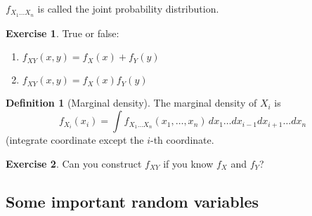 \documentclass[
  openany]{book}
\theoremstyle{definition}
\newtheorem{definition}{Definition}[chapter]
\theoremstyle{definition}
\theoremstyle{definition}
\newtheorem{exercise}{Exercise}[chapter]
\theoremstyle{definition}
\theoremstyle{remark}
\begin{document}
\(f_{X_1\dots X_n}\) is called the joint probability distribution.

\begin{exercise}

True or false:

\begin{enumerate}
\def\labelenumi{\arabic{enumi}.}
\item
  \(f_{XY}(x,y) = f_{X}(x) + f_{Y}(y)\)
\item
  \(f_{XY}(x,y) = f_{X}(x)  f_{Y}(y)\)
\end{enumerate}

\end{exercise}

\begin{definition}[Marginal density]
The marginal density of \(X_i\) is
\[f_{X_i}(x_i) = \int f_{X_1\dots X_n}(x_1, \dots, x_n) \, dx_1\dots dx_{i-1} dx_{i+1} \dots dx_n\]
(integrate coordinate except the \(i\)-th coordinate.
\end{definition}

\begin{exercise}
Can you construct \(f_{XY}\) if you know \(f_X\) and \(f_Y\)?
\end{exercise}

\subsection{Some important random variables}\label{some-important-random-variables}
\end{document}
